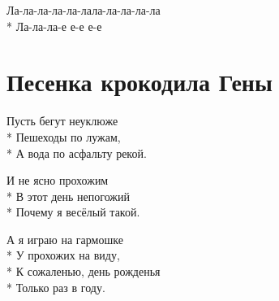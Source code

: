 \medskip

\begin{minipage}{\linewidth}
\hspace*{1.5em}Ла-ла-ла-ла-ла-лала-ла-ла-ла-ла\\*
\hspace*{1.5em}Ла-ла-ла-е е-е е-е\\
\end{minipage}

\vspace{\fill}\newpage

\section{Песенка крокодила Гены}
\label{song:Песенка_крокодила_Гены}

\medskip

\begin{minipage}{\linewidth}
Пусть бегут неуклюже\\*
Пешеходы по лужам,\\*
А вода по асфальту рекой.\\
\end{minipage}\par\medskip\nobreak

\medskip

\begin{minipage}{\linewidth}
И не ясно прохожим\\*
В этот день непогожий\\*
Почему я весёлый такой.\\
\end{minipage}\par\medskip\nobreak

\medskip

\begin{minipage}{\linewidth}
\hspace*{1.5em}А я играю на гармошке\\*
\hspace*{1.5em}У прохожих на виду,\\*
\hspace*{1.5em}К сожаленью, день рожденья\\*
\hspace*{1.5em}Только раз в году.\\
\end{minipage}\par\medskip\nobreak


